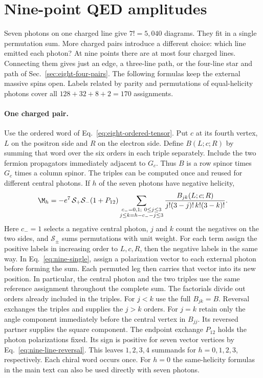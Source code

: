 \section{Nine-point QED amplitudes}\label{sec:nine-qed}

Seven photons on one charged line give $7!=5{,}040$ diagrams.
They fit in a single permutation sum. More charged pairs introduce a
different choice: which line emitted each photon? At nine points there
are at most four charged lines. Connecting them gives just an edge, a
three-line path, or the four-line star and path of
Sec.~\ref{sec:eight-four-pairs}. The following formulas keep the
external massive spins open. Labels related by parity and permutations
of equal-helicity photons cover all $128+32+8+2=170$ assignments.

\paragraph{One charged pair.}
Use the ordered word of Eq.~\eqref{eq:eight-ordered-tensor}. Put $c$
at its fourth vertex, $L$ on the positron side and $R$ on the electron
side. Define $B(L;c;R)$ by summing that word over the six orders in
each triple separately. Include the two fermion propagators immediately
adjacent to $G_c$. Thus $B$ is a row spinor times $G_c$ times a column
spinor. The triples can be computed once and reused for different
central photons. If $h$ of the seven photons have negative helicity,
\begin{equation}
 \M_h=-e^7\,\mathcal S_+\mathcal S_-(1+P_{12})
 \sum_{\substack{c_-=0,1;\ 0\le j\le3\\ j\le k=h-c_--j\le3}}
 \frac{B_{jk}(L;c;R)}{j!(3-j)!\,k!(3-k)!}.
 \label{eq:nine-single}
\end{equation}
Here $c_-=1$ selects a negative central photon, $j$ and $k$ count
the negatives on the two sides, and $\mathcal S_\pm$ sums permutations
with unit weight. For each term assign the positive labels in increasing
order to $L,c,R$, then the negative labels in the same way. In Eq.~\eqref{eq:nine-single}, assign a polarization vector to each
external photon before forming the sum. Each permuted leg then carries
that vector into its new position. In particular, the central photon
and the two triples use the same reference assignment throughout the
complete sum. The factorials divide out orders already included in the triples.
For $j<k$ use the full $B_{jk}=B$. Reversal exchanges the triples and
supplies the $j>k$ orders. For $j=k$ retain only the angle component
immediately before the central vertex in $B_{jj}$. Its reversed partner
supplies the square component. The endpoint exchange $P_{12}$ holds
the photon polarizations fixed. Its sign is positive for seven vector
vertices by Eq.~\eqref{eq:nine-line-reversal}. This leaves $1,2,3,4$
summands for $h=0,1,2,3$, respectively. Each chiral word occurs once. For $h=0$ the
same-helicity formulas in the main text can also be used directly with
seven photons.


